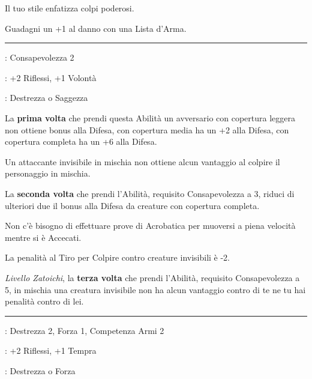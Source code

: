\begin{multicols}{2}
Il tuo stile enfatizza colpi poderosi.

Guadagni un +1 al danno con una Lista d'Arma.

\smallskip\noindent\rule{\linewidth}{2pt} \hypertarget{Combattere alla Cieca}{}\medskip{}
\noindent
\begin{description}[noitemsep, topsep=0pt, parsep=0pt, partopsep=0pt, leftmargin=0cm, labelwidth=2.5cm]
    \item[\textbf{Requisito}]: Consapevolezza 2
    \item[\textbf{Tiri Salvezza}]: +2 Riflessi, +1 Volontà
    \item[\textbf{Caratteristica}]: Destrezza o Saggezza
\end{description}

La \textbf{prima volta} che prendi questa Abilità un avversario con copertura leggera non ottiene bonus alla Difesa, con copertura media ha un +2 alla Difesa, con copertura completa ha un +6 alla Difesa.

Un attaccante invisibile in mischia non ottiene alcun vantaggio al colpire il personaggio in mischia.

La \textbf{seconda volta} che prendi l'Abilità, requisito Consapevolezza a 3, riduci di ulteriori due il bonus alla Difesa da creature con copertura completa.

Non c'è bisogno di effettuare prove di Acrobatica per muoversi a piena velocità mentre si è Accecati.

La penalità al Tiro per Colpire contro creature invisibili è -2.

\emph{Livello Zatoichi}, la \textbf{terza volta} che prendi l'Abilità, requisito Consapevolezza a 5, in mischia una creatura invisibile non ha alcun vantaggio contro di te ne tu hai penalità contro di lei.

\smallskip\noindent\rule{\linewidth}{2pt} \hypertarget{Combattimento con due armi}{}\medskip{}
\noindent
\begin{description}[noitemsep, topsep=0pt, parsep=0pt, partopsep=0pt, leftmargin=0cm, labelwidth=2.5cm]
    \item[\textbf{Requisito}]: Destrezza 2, Forza 1, Competenza Armi 2
    \item[\textbf{Tiri Salvezza}]: +2 Riflessi, +1 Tempra
    \item[\textbf{Caratteristica}]: Destrezza o Forza
\end{description}


\end{multicols}
